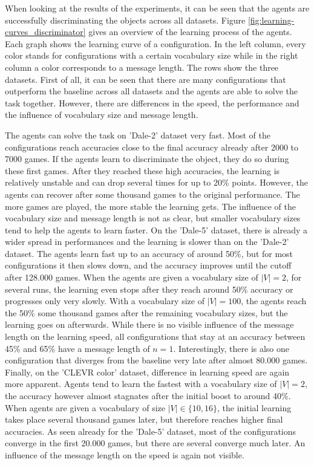 When looking at the results of the experiments, it can be seen that the agents are successfully discriminating the objects across all datasets.
Figure \ref{fig:learning-curves_discriminator} gives an overview of the learning process of the agents.
Each graph shows the learning curve of a configuration.
In the left column, every color stands for configurations with a certain vocabulary size while in the right column a color corresponds to a message length.
The rows show the three datasets.
First of all, it can be seen that there are many configurations that outperform the baseline across all datasets and the agents are able to solve the task together.
However, there are differences in the speed, the performance and the influence of vocabulary size and message length.

The agents can solve the task on 'Dale-2' dataset very fast.
Most of the configurations reach accuracies close to the final accuracy already after 2000 to 7000 games.
If the agents learn to discriminate the object, they do so during these first games.
After they reached these high accuracies, the learning is relatively unstable and can drop several times for up to 20\% points.
However, the agents can recover after some thousand games to the original performance.
The more games are played, the more stable the learning gets.
The influence of the vocabulary size and message length is not as clear, but smaller vocabulary sizes tend to help the agents to learn faster.
On the 'Dale-5' dataset, there is already a wider spread in performances and the learning is slower than on the 'Dale-2' dataset.
The agents learn fast up to an accuracy of around 50\%, but for most configurations it then slows down, and the accuracy improves until the cutoff after 128.000 games.
When the agents are given a vocabulary size of $|V|=2$, for several runs, the learning even stops after they reach around 50\% accuracy or progresses only very slowly.
With a vocabulary size of $|V|=100$, the agents reach the 50\% some thousand games after the remaining vocabulary sizes, but the learning goes on afterwards.
While there is no visible influence of the message length on the learning speed, all configurations that stay at an accuracy between 45\% and 65\% have a message length of $n=1$.
Interestingly, there is also one configuration that diverges from the baseline very late after almost 80.000 games.
Finally, on the 'CLEVR color' dataset, difference in learning speed are again more apparent.
Agents tend to learn the fastest with a vocabulary size of $|V|=2$, the accuracy however almost stagnates after the initial boost to around 40\%.
When agents are given a vocabulary of size $|V| \in \{10,16\}$, the initial learning takes place several thousand games later, but therefore reaches higher final accuracies.
As seen already for the 'Dale-5' dataset, most of the configurations converge in the first 20.000 games, but there are several converge much later.
An influence of the message length on the speed is again not visible.

